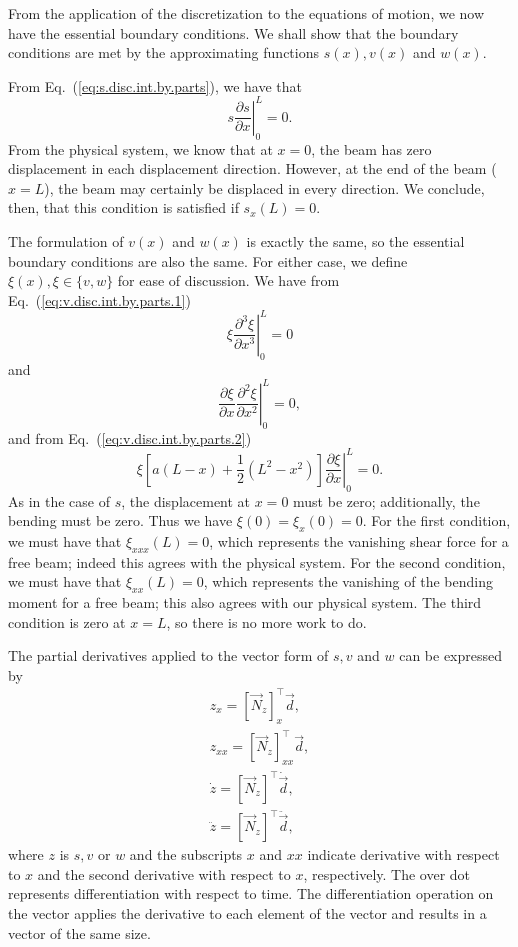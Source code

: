 From the application of the discretization to the equations of motion, we now have the essential boundary conditions. We shall show that the boundary conditions are met by the approximating functions $s(x), v(x)$ and $w(x)$.

From Eq.~(\ref{eq:s.disc.int.by.parts}), we have that 
\begin{equation}
\left.s\frac{\partial s}{\partial x}\right|_0^L = 0.
\end{equation}
From the physical system, we know that at $x=0$, the beam has zero displacement in each displacement direction. However, at the end of the beam ($x=L$), the beam may certainly be displaced in every direction. We conclude, then, that this condition is satisfied if $s_x(L) = 0$. 

The formulation of $v(x)$ and $w(x)$ is exactly the same, so the essential boundary conditions are also the same. For either case, we define $\xi(x), \xi\in\{v,w\}$ for ease of discussion. We have from Eq.~(\ref{eq:v.disc.int.by.parts.1})
\begin{equation}
\left.\xi\frac{\partial^3 \xi}{\partial x^3}\right|_0^L = 0
\end{equation}
and  
\begin{equation}
\left.\frac{\partial \xi}{\partial x}\frac{\partial^2 \xi}{\partial x^2}\right|_0^L = 0,
\end{equation}
and from Eq.~(\ref{eq:v.disc.int.by.parts.2})
\begin{equation}
\left.\xi\left[a(L-x)+\frac{1}{2}(L^2-x^2)\right]\frac{\partial \xi}{\partial x}\right|_0^L = 0.
\end{equation}
As in the case of $s$, the displacement at $x=0$ must be zero; additionally, the bending must be zero. Thus we have $\xi(0)=\xi_x(0)=0$. For the first condition, we must have that $\xi_{xxx}(L) = 0$, which represents the vanishing shear force for a free beam; indeed this agrees with the physical system. For the second condition, we must have that $\xi_{xx}(L) = 0$, which represents the vanishing of the bending moment for a free beam; this also agrees with our physical system. The third condition is zero at $x=L$, so there is no more work to do. 

The partial derivatives applied to the vector form of $s,v$ and $w$ can be expressed by
\begin{eqnarray}
z_x = [\vec N_z]_x^\top\vec d, \\
z_{xx} = [\vec N_z]_{xx}^\top\vec d, \\
\dot z = [\vec N_z]^\top\dot{\vec d}, \\
\ddot z = [\vec N_z]^\top\ddot{\vec d},
\end{eqnarray}
where $z$ is $s,v$ or $w$ and the subscripts $x$ and $xx$ indicate derivative with respect to $x$ and the second derivative with respect to $x$, respectively. The over dot represents differentiation with respect to time. The differentiation operation on the vector applies the derivative to each element of the vector and results in a vector of the same size. 

